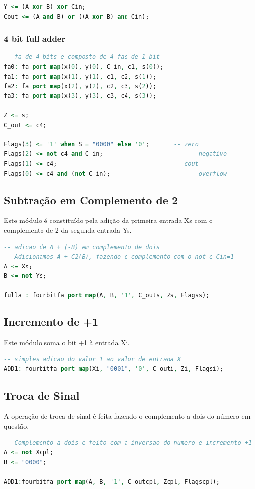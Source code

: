 \documentclass[a4paper, 12pt]{article}
\begin{document}
\begin{lstlisting}[language=VHDL]
Y <= (A xor B) xor Cin;
Cout <= (A and B) or ((A xor B) and Cin);
\end{lstlisting}


\subsubsection{4 bit full adder}


\begin{lstlisting}[language=VHDL]
-- fa de 4 bits e composto de 4 fas de 1 bit
fa0: fa port map(x(0), y(0), C_in, c1, s(0));
fa1: fa port map(x(1), y(1), c1, c2, s(1));
fa2: fa port map(x(2), y(2), c2, c3, s(2));
fa3: fa port map(x(3), y(3), c3, c4, s(3));

Z <= s;
C_out <= c4;

Flags(3) <= '1' when S = "0000" else '0';       -- zero
Flags(2) <= not c4 and C_in;				        -- negativo
Flags(1) <= c4;	                                -- cout
Flags(0) <= c4 and (not C_in); 					    -- overflow
\end{lstlisting}

\subsection{Subtração em Complemento de 2}
Este módulo é constituído pela adição da primeira entrada Xs com o complemento de 2 da segunda entrada Ys.

\begin{lstlisting}[language=VHDL]
-- adicao de A + (-B) em complemento de dois
-- Adicionamos A + C2(B), fazendo o complemento com o not e Cin=1
A <= Xs;
B <= not Ys;

fulla : fourbitfa port map(A, B, '1', C_outs, Zs, Flagss);
\end{lstlisting}


\subsection{Incremento de +1}
Este módulo soma o bit +1 à entrada Xi.

\begin{lstlisting}[language=VHDL]
-- simples adicao do valor 1 ao valor de entrada X
ADD1: fourbitfa port map(Xi, "0001", '0', C_outi, Zi, Flagsi);
\end{lstlisting}

\subsection{Troca de Sinal}
A operação de troca de sinal é feita fazendo o complemento a dois do número em questão.
\begin{lstlisting}[language=VHDL]
-- Complemento a dois e feito com a inversao do numero e incremento +1
A <= not Xcpl;
B <= "0000";

ADD1:fourbitfa port map(A, B, '1', C_outcpl, Zcpl, Flagscpl);
\end{lstlisting}
\end{document}
